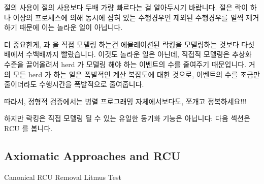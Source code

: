 {	 절의 사용이  절의 사용보다 두배 가량 빠르다는 걸
	알아두시기 바랍니다.
	 절은 락이 하나 이상의 프로세스에 의해 동시에 잡혀 있는
	수행경우인 제외된 수행경우를 일찍 제거하기 때문에 이는 놀라운 일이
	아닙니다.
	\iffalse

	Note also that use of the \co{filter} clause is about twice
	as fast as is use of the \co{exists} clause.
	This is no surprise because the \co{filter} clause allows
	early abandoning of excluded executions, where the executions
	that are excluded are the ones in which the lock is concurrently
	held by more than one process.
	\fi

	더 중요한게,  과  을 직접 모델링
	하는건 에뮬레이션된 락킹을 모델링하는 것보다 다섯배에서 수백배까지
	빨랐습니다.
	이것도 놀라운 일은 아닌데, 직접적 모델링은 추상화 수준을 끌어올려서
	herd 가 모델링 해야 하는 이벤트의 수를 줄여주기 때문입니다.
	거의 모든 herd 가 하는 일은 폭발적인 계산 복잡도에 대한 것으로,
	이벤트의 수를 조금만 줄이더라도 수행시간을 폭발적으로 줄여줍니다.

	따라서, 정형적 검증에서는 병렬 프로그래밍 자체에서보다도, 쪼개고
	정복하세요!!!
	\iffalse

	More important, modeling \co{spin_lock()} and \co{spin_unlock()}
	directly ranges from five times faster to more than two orders
	of magnitude faster than modeling emulated locking.
	This should also be no surprise, as direct modeling raises
	the level of abstraction, thus reducing the number of events
	that herd must model.
	Because almost everything that herd does is of exponential
	computational complexity, modest reductions in the number of
	events produces exponentially large reductions in runtime.

	Thus, in formal verification even more than in parallel
	programming itself, divide and conquer!!!
	\fi
} \QuickQuizEnd

하지만 락킹은 직접 모델링 될 수 있는 유일한 동기화 기능은 아닙니다:
다음 섹션은 RCU 를 봅니다.
\iffalse

But locking is not the only synchronization primitive that can be
modeled directly:
The next section looks at RCU.
\fi

\subsection{Axiomatic Approaches and RCU}
\label{sec:formal:Axiomatic Approaches and RCU}

\begin{listing}[tb]

\caption{Canonical RCU Removal Litmus Test}
\label{lst:formal:Canonical RCU Removal Litmus Test}
\end{listing}

